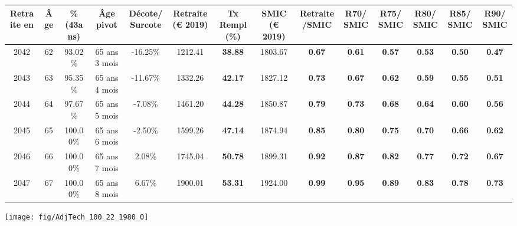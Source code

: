 \begin{adjustbox}{max width=\textwidth} 
\begin{tabular}[htb]{|c|c||c|c|c||c|c||c|c||c|c|c|c|c|} 
\hline 
 Retraite en &  Âge &  \%(43ans) &  Âge pivot &  Décote/Surcote &  Retraite (\euro{} 2019) &  Tx Rempl(\%) &  SMIC (\euro{} 2019) &  Retraite/SMIC &  R70/SMIC &  R75/SMIC &  R80/SMIC &  R85/SMIC &  R90/SMIC \\ 
\hline \hline 
 2042 &  62 &  93.02\% &  65 ans 3 mois &  -16.25\% &  1212.41 &  {\bf 38.88} &  1803.67 &  {\bf {\color{red} 0.67}} &  {\bf {\color{red} 0.61}} &  {\bf {\color{red} 0.57}} &  {\bf {\color{red} 0.53}} &  {\bf {\color{red} 0.50}} &  {\bf {\color{red} 0.47}} \\ 
\hline 
 2043 &  63 &  95.35\% &  65 ans 4 mois &  -11.67\% &  1332.26 &  {\bf 42.17} &  1827.12 &  {\bf {\color{red} 0.73}} &  {\bf {\color{red} 0.67}} &  {\bf {\color{red} 0.62}} &  {\bf {\color{red} 0.59}} &  {\bf {\color{red} 0.55}} &  {\bf {\color{red} 0.51}} \\ 
\hline 
 2044 &  64 &  97.67\% &  65 ans 5 mois &  -7.08\% &  1461.20 &  {\bf 44.28} &  1850.87 &  {\bf {\color{red} 0.79}} &  {\bf {\color{red} 0.73}} &  {\bf {\color{red} 0.68}} &  {\bf {\color{red} 0.64}} &  {\bf {\color{red} 0.60}} &  {\bf {\color{red} 0.56}} \\ 
\hline 
 2045 &  65 &  100.00\% &  65 ans 6 mois &  -2.50\% &  1599.26 &  {\bf 47.14} &  1874.94 &  {\bf {\color{red} 0.85}} &  {\bf {\color{red} 0.80}} &  {\bf {\color{red} 0.75}} &  {\bf {\color{red} 0.70}} &  {\bf {\color{red} 0.66}} &  {\bf {\color{red} 0.62}} \\ 
\hline 
 2046 &  66 &  100.00\% &  65 ans 7 mois &  2.08\% &  1745.04 &  {\bf 50.78} &  1899.31 &  {\bf {\color{red} 0.92}} &  {\bf {\color{red} 0.87}} &  {\bf {\color{red} 0.82}} &  {\bf {\color{red} 0.77}} &  {\bf {\color{red} 0.72}} &  {\bf {\color{red} 0.67}} \\ 
\hline 
 2047 &  67 &  100.00\% &  65 ans 8 mois &  6.67\% &  1900.01 &  {\bf 53.31} &  1924.00 &  {\bf {\color{red} 0.99}} &  {\bf {\color{red} 0.95}} &  {\bf {\color{red} 0.89}} &  {\bf {\color{red} 0.83}} &  {\bf {\color{red} 0.78}} &  {\bf {\color{red} 0.73}} \\ 
\hline 
\hline 
\end{tabular} 
\end{adjustbox} 
 
 \vspace{0.1cm} 

 {\hspace{-2.2cm}\texttt{[image: fig/AdjTech\_100\_22\_1980\_0]}} 


